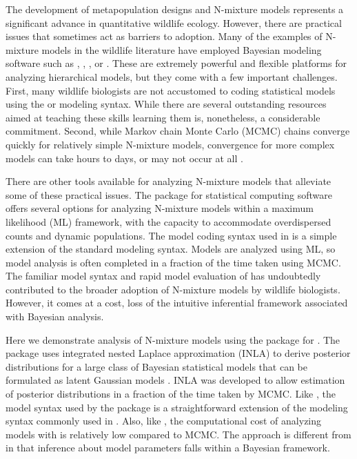 \documentclass[codesnippet]{jss}
\begin{document}
The development of metapopulation designs and N-mixture models represents a significant advance in quantitative wildlife ecology. However, there are practical issues that sometimes act as barriers to adoption. Many of the examples of N-mixture models in the wildlife literature have employed Bayesian modeling software such as , , , or  \citep{plummer2003jags,Lunn_Jackson_Best_Thomas_Spiegelhalter_2012,Carpenter_Gelman_Hoffman_Lee_et_al_2017}. These are extremely powerful and flexible platforms for analyzing hierarchical models, but they come with a few important challenges. First, many wildlife biologists are not accustomed to coding statistical models using the  or  modeling syntax. While there are several outstanding resources aimed at teaching these skills \citep{Royle_Dorazio_2008, Kery_2010, Kery_Schaub_2011, Kery_Royle_2015, Korner-Nievergelt_Roth_et_al_2015} learning them is, nonetheless, a considerable commitment. Second, while Markov chain Monte Carlo (MCMC) chains converge quickly for relatively simple N-mixture models, convergence for more complex models can take hours to days, or may not occur at all \citep{Kery_Schaub_2011}.

There are other tools available for analyzing N-mixture models that alleviate some of these practical issues. The  package \citep{Fiske_Chandler_2011} for  statistical computing software \citep{R_Core_Team_2016} offers several options for analyzing N-mixture models within a maximum likelihood (ML) framework, with the capacity to accommodate overdispersed counts and dynamic populations. The model coding syntax used in  is a simple extension of the standard  modeling syntax. Models are analyzed using ML, so model analysis is often completed in a fraction of the time taken using MCMC. The familiar model syntax and rapid model evaluation of  has undoubtedly contributed to the broader adoption of N-mixture models by wildlife biologists. However, it comes at a cost, loss of the intuitive inferential framework associated with Bayesian analysis.

Here we demonstrate analysis of N-mixture models using the  package \citep{Martins_Simpson_Lindgren_Rue_2013,Rue_Riebler_Sorbye_Illian_Simpson_Lindgren_2017} for . The  package uses integrated nested Laplace approximation (INLA) to derive posterior distributions for a large class of Bayesian statistical models that can be formulated as latent Gaussian models \citep{Rue_Martino_Chopin_2009, Lindgren_Rue_Lindstrom_2011}. INLA was developed to allow estimation of posterior distributions in a fraction of the time taken by MCMC. Like , the model syntax used by the  package is a straightforward extension of the modeling syntax commonly used in . Also, like , the computational cost of analyzing models with  is relatively low compared to MCMC. The  approach is different from  in that inference about model parameters falls within a Bayesian framework.
\end{document}
